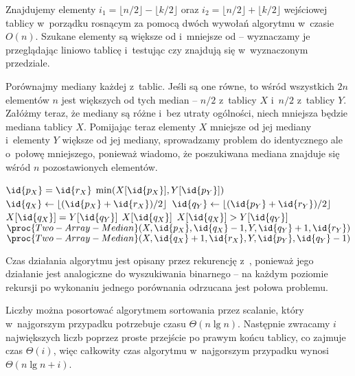 \exercise %

\exercise %
Znajdujemy elementy $i_1=\lfloor n/2\rfloor-\lfloor k/2\rfloor$ oraz $i_2=\lfloor n/2\rfloor+\lfloor k/2\rfloor$ wejściowej tablicy w~porządku rosnącym za pomocą dwóch wywołań algorytmu  w~czasie $O(n)$. Szukane elementy są większe od  i~mniejsze od  -- wyznaczamy je przeglądając liniowo tablicę i~testując czy znajdują się w~wyznaczonym przedziale.

\exercise %
Porównajmy mediany każdej z~tablic. Jeśli są one równe, to wśród wszystkich $2n$ elementów $n$ jest większych od tych median -- $n/2$ z~tablicy $X$ i~$n/2$ z~tablicy $Y$. Załóżmy teraz, że mediany są różne i~bez utraty ogólności, niech mniejsza będzie mediana tablicy $X$. Pomijając teraz elementy $X$ mniejsze od jej mediany i~elementy $Y$ większe od jej mediany, sprowadzamy problem do identycznego ale o~połowę mniejszego, ponieważ wiadomo, że poszukiwana mediana znajduje się wśród $n$ pozostawionych elementów.
\begin{codebox}
\li	\If $\id{p_X}=\id{r_X}$
\li		\Then \Return $\min(X[\id{p_X}],Y[\id{p_Y}])$
		\End
\li	$\id{q_X}\gets\lfloor(\id{p_X}+\id{r_X})/2\rfloor$
\li	$\id{q_Y}\gets\lfloor(\id{p_Y}+\id{r_Y})/2\rfloor$
\li	\If $X[\id{q_X}]=Y[\id{q_Y}]$
\li		\Then \Return $X[\id{q_X}]$
		\End
\li	\If $X[\id{q_X}]>Y[\id{q_Y}]$
\li		\Then \Return $\proc{Two-Array-Median}(X,\id{p_X},\id{q_X}-1,Y,\id{q_Y}+1,\id{r_Y})$
\li		\Else \Return $\proc{Two-Array-Median}(X,\id{q_X}+1,\id{r_X},Y,\id{p_Y},\id{q_Y}-1)$
		\End
\end{codebox}

Czas działania algorytmu jest opisany przez rekurencję z~, ponieważ jego działanie jest analogiczne do wyszukiwania binarnego -- na każdym poziomie rekursji po wykonaniu jednego porównania odrzucana jest połowa problemu.

\exercise %

\problems


\subproblem %
Liczby można posortować algorytmem sortowania przez scalanie, który w~najgorszym przypadku potrzebuje czasu $\Theta(n\lg n)$. Następnie zwracamy $i$ największych liczb poprzez proste przejście po prawym końcu tablicy, co zajmuje czas $\Theta(i)$, więc całkowity czas algorytmu w~najgorszym przypadku wynosi $\Theta(n\lg n+i)$.

